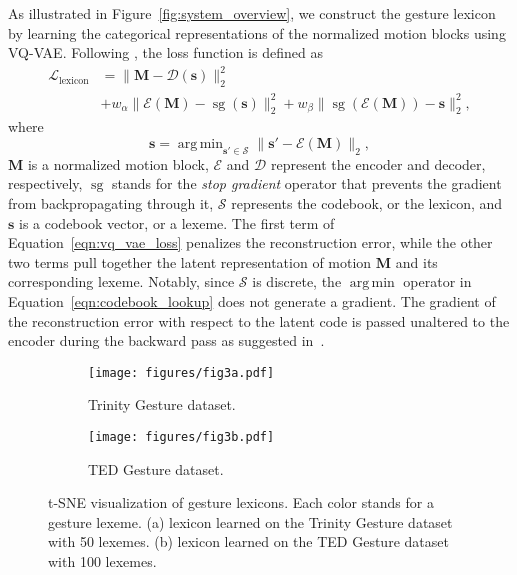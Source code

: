 \documentclass[acmtog,authorversion]{acmart}
\newcommand{\vect}[1]{\bm{#1}}
\newcommand{\eqword}[1]{{\text{#1}}}
\DeclareMathOperator*{\argmin}{arg\,min}
\DeclareMathOperator*{\stopgrad}{sg}
\newcommand{\fig}{Figure{}~}
\newcommand{\eqn}{Equation{}~}
\begin{document}
As illustrated in \fig\ref{fig:system_overview}, we construct the gesture lexicon by learning the categorical representations of the normalized motion blocks using VQ-VAE. Following \cite{oord2017neural}, the loss function is defined as
\begin{align}
    \mathcal{L}_{\eqword{lexicon}} &= \lVert \vect{M}-\mathcal{D}({\vect{s}}) \rVert_2^2 \nonumber\\
    &+  w_{\alpha}\lVert \mathcal{E}(\vect{M}) -\stopgrad({\vect{s}}) \rVert_2^2 
    +  w_{\beta}\lVert \stopgrad(\mathcal{E}(\vect{M})) - {\vect{s}} \rVert_2^2,
    \label{eqn:vq_vae_loss}
\end{align}
where
\begin{equation}
    {\vect{s}} = \argmin_{\vect{s}'\in \mathcal{S}} \lVert \vect{s}' - \mathcal{E}(\vect{M}) \rVert_2, \label{eqn:codebook_lookup}
\end{equation}
$\vect{M}$ is a normalized motion block, $\mathcal{E}$ and $\mathcal{D}$ represent the encoder and decoder, respectively, $\stopgrad$ stands for the \emph{stop gradient} operator that prevents the gradient from backpropagating through it, $\mathcal{S}$ represents the codebook, or the lexicon, and $\vect{s}$ is a codebook vector, or a lexeme. The first term of \eqn\eqref{eqn:vq_vae_loss} penalizes the reconstruction error, while the other two terms pull together the latent representation of motion $\vect{M}$ and its corresponding lexeme. Notably, since $\mathcal{S}$ is discrete, the $\argmin$ operator in \eqn\eqref{eqn:codebook_lookup} does not generate a gradient. The gradient of the reconstruction error with respect to the latent code is passed unaltered to the encoder during the backward pass as suggested in~\cite{oord2017neural}.
\begin{figure}[t]
    \centering
    \begin{subfigure}[t]{0.47\linewidth}
        \centering
        \texttt{[image: figures/fig3a.pdf]}
        \caption{Trinity Gesture dataset.}
\end{subfigure}
    \hspace{\fill}
    \begin{subfigure}[t]{0.47\linewidth}
        \centering
        \texttt{[image: figures/fig3b.pdf]}
        \caption{TED Gesture dataset.}
\end{subfigure}
    \caption{t-SNE visualization of gesture lexicons. Each color stands for a gesture lexeme. (a) lexicon learned on the Trinity Gesture dataset with 50 lexemes. (b) lexicon learned on the TED Gesture dataset with 100 lexemes.}
    \Description{}
    \label{fig:gesture_lexicon}
\end{figure}
\end{document}
